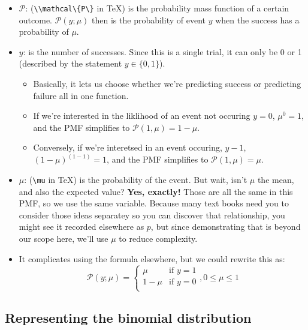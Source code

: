 \documentclass[
]{book}
\providecommand{\tightlist}{%
  \setlength{\itemsep}{0pt}\setlength{\parskip}{0pt}}
\begin{document}
\begin{itemize}
\tightlist
\item
  \(\mathcal{P}\): (\texttt{\textbackslash{}\textbackslash{}mathcal\textbackslash{}\{P\textbackslash{}\}} in TeX) is the probability mass function of a certain outcome. \(\mathcal{P}(y;\mu)\) then is the probability of event \(y\) when the success has a probability of \(\mu\).
\item
  \(y\): is the number of successes. Since this is a single trial, it can only be 0 or 1 (described by the statement \(y\in\{0, 1\}\)).

  \begin{itemize}
  \tightlist
  \item
    Basically, it lets us choose whether we're predicting success or predicting failure all in one function.
  \item
    If we're interested in the liklihood of an event not occuring \(y=0\), \(\mu^0=1\), and the PMF simplifies to \(\mathcal{P(1,\mu)}=1-\mu\).
  \item
    Conversely, if we're interetsed in an event occuring, \(y-1\), \((1-\mu)^{(1-1)}=1\), and the PMF simplifies to \(\mathcal{P(1,\mu)}=\mu\).
  \end{itemize}
\item
  \(\mu\): (\texttt{\textbackslash{}mu} in TeX) is the probability of the event. But wait, isn't \(\mu\) the mean, and also the expected value? \textbf{Yes, exactly!} Those are all the same in this PMF, so we use the same variable. Because many text books need you to consider those ideas separatey so you can discover that relationship, you might see it recorded elsewhere as \(p\), but since demonstrating that is beyond our scope here, we'll use \(\mu\) to reduce complexity.
\item
  It complicates using the formula elsewhere, but we could rewrite this as:
  \[
  \mathcal{P}(y;\mu)=
  \begin{cases}
  \mu&\textrm{if }y=1\\
  1-\mu&\textrm{if }y=0\\
  \end{cases}, 0\leq\mu\leq1
  \]
\end{itemize}

\hypertarget{representing-the-binomial-distribution}{%
\subsection{Representing the binomial distribution}\label{representing-the-binomial-distribution}}
\end{document}

